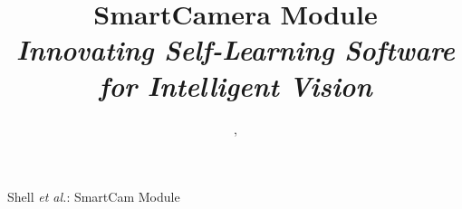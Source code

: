 \documentclass[journal,transmag]{IEEEtran}
\begin{document}
%
\title{\textbf{SmartCamera Module} \\ \textit{Innovating Self-Learning Software for Intelligent Vision}}




\author{,

}



%
{Shell \MakeLowercase{\textit{et al.}}: SmartCam Module}
% 







\end{document}

